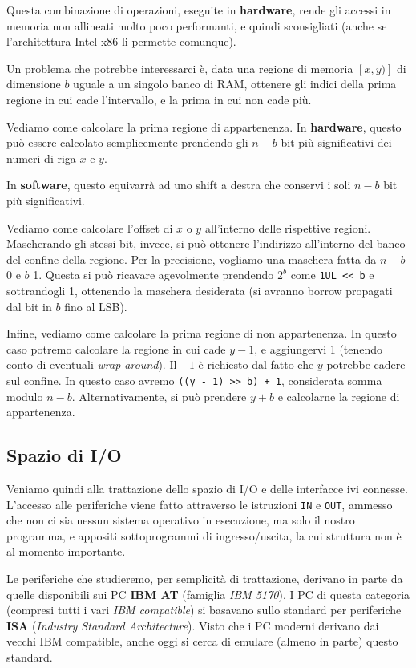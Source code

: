 \documentclass[a4paper,11pt]{article}
\begin{document}
Questa combinazione di operazioni, eseguite in \textbf{hardware}, rende gli accessi in memoria non allineati molto poco performanti, e quindi sconsigliati (anche se l'architettura Intel x86 li permette comunque).

\par\medskip 

Un problema che potrebbe interessarci è, data una regione di memoria $[x, y)]$ di dimensione $b$ uguale a un singolo banco di RAM, ottenere gli indici della prima regione in cui cade l'intervallo, e la prima in cui non cade più.

Vediamo come calcolare la prima regione di appartenenza.
In \textbf{hardware}, questo può essere calcolato semplicemente prendendo gli $n - b$ bit più significativi dei numeri di riga $x$ e $y$.

In \textbf{software}, questo equivarrà ad uno shift a destra che conservi i soli $n-b$ bit più significativi.

Vediamo come calcolare l'offset di $x$ o $y$ all'interno delle rispettive regioni.
Mascherando gli stessi bit, invece, si può ottenere l'indirizzo all'interno del banco del confine della regione.
Per la precisione, vogliamo una maschera fatta da $n - b$ 0 e $b$ 1.
Questa si può ricavare agevolmente prendendo $2^b$ come \lstinline|1UL << b| e sottrandogli 1, ottenendo la maschera desiderata (si avranno borrow propagati dal bit in $b$ fino al LSB).

Infine, vediamo come calcolare la prima regione di non appartenenza.
In questo caso potremo calcolare la regione in cui cade $y - 1$, e aggiungervi 1 (tenendo conto di eventuali \textit{wrap-around}). Il $-1$ è richiesto dal fatto che $y$ potrebbe cadere sul confine.
In questo caso avremo \lstinline|((y - 1) >> b) + 1|, considerata somma modulo $n - b$.
Alternativamente, si può prendere $y + b$ e calcolarne la regione di appartenenza.

\subsection{Spazio di I/O}
Veniamo quindi alla trattazione dello spazio di I/O e delle interfacce ivi connesse.
L'accesso alle periferiche viene fatto attraverso le istruzioni \lstinline|IN| e \lstinline|OUT|, ammesso che non ci sia nessun sistema operativo in esecuzione, ma solo il nostro programma, e appositi sottoprogrammi di ingresso/uscita, la cui struttura non è al momento importante.

Le periferiche che studieremo, per semplicità di trattazione, derivano in parte da quelle disponibili sui PC \textbf{IBM AT} (famiglia \textit{IBM 5170}).
I PC di questa categoria (compresi tutti i vari \textit{IBM compatible}) si basavano sullo standard per periferiche \textbf{ISA} (\textit{Industry Standard Architecture}).
Visto che i PC moderni derivano dai vecchi IBM compatible, anche oggi si cerca di emulare (almeno in parte) questo standard.
\end{document}
